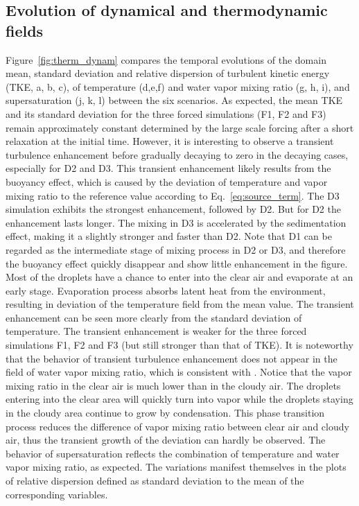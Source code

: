 \documentclass[draft,jgrga]{AGUTeX}
\newcommand{\Eq}[1]{Eq.~\eqref{#1}} \newcommand{\Fig}[1]{Figure~\ref{#1}}
\begin{document}
\begin{article}
\subsection{Evolution of dynamical and thermodynamic fields}
\Fig{fig:therm_dynam} compares the temporal evolutions of the domain mean, standard deviation and relative dispersion of turbulent kinetic energy (TKE, a, b, c), of temperature (d,e,f) and water vapor mixing ratio (g, h, i), and supersaturation (j, k, l) between the six scenarios.  As expected, the mean TKE and its standard deviation for the three forced simulations (F1, F2 and F3) remain approximately constant determined by the large scale forcing after a short relaxation at the initial time. However, it is interesting to observe a transient turbulence enhancement before gradually decaying to zero in the decaying cases, especially for D2 and D3. This transient enhancement likely results from the buoyancy effect, which is caused by the deviation of temperature and vapor mixing ratio to the reference value according to \Eq{eq:source_term}. The D3 simulation exhibits the strongest enhancement, followed by D2. But for D2 the enhancement lasts longer. The mixing in D3 is accelerated by the sedimentation effect, making it a slightly stronger and faster than D2. Note that D1 can be regarded as the intermediate stage of mixing process in D2 or D3, and therefore the buoyancy effect quickly disappear and show little enhancement in the figure.  Most of the droplets have a chance to enter into the clear air and evaporate at an early stage. Evaporation process absorbs latent heat from the environment, resulting in deviation of the temperature field from the mean value. The transient enhancement can be seen more clearly from the standard deviation of temperature. The transient enhancement is weaker for the three forced simulations F1, F2 and F3 (but still stronger than that of TKE).  It is noteworthy that the behavior of transient turbulence enhancement does not appear in the field of water vapor mixing ratio, which is consistent with \cite{Kumar14}. Notice that the vapor mixing ratio in the clear air is much lower than in the cloudy air. The droplets entering into the clear area will quickly turn into vapor while the droplets staying in the cloudy area continue to grow by condensation. This phase transition process reduces the difference of vapor mixing ratio between clear air and cloudy air, thus the transient growth of the deviation can hardly be observed.  The behavior of supersaturation reflects the combination of temperature and water vapor mixing ratio, as expected. The variations manifest themselves in the plots of relative dispersion defined as standard deviation to the mean of the corresponding variables.


\end{article}
\end{document}
